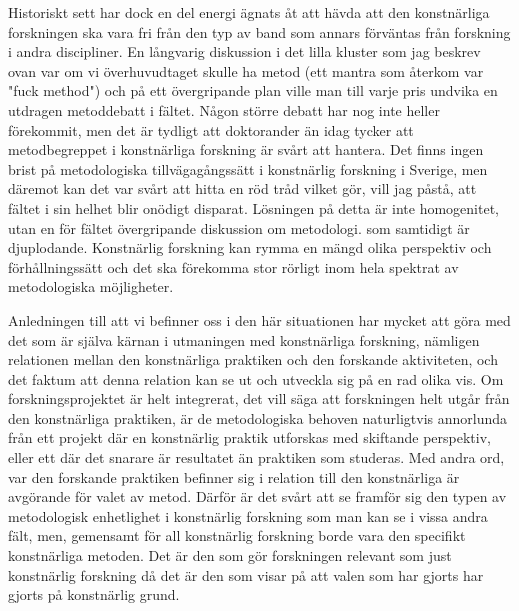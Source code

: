 \documentclass[11pt]{article}
\begin{document}
Historiskt sett har dock en del energi ägnats åt att hävda att den
konstnärliga forskningen ska vara fri från den typ av band som annars
förväntas från forskning i andra discipliner. En långvarig diskussion
i det lilla kluster som jag beskrev ovan var om vi överhuvudtaget
skulle ha metod (ett mantra som återkom var "fuck method") och på ett
övergripande plan ville man till varje pris undvika en utdragen
metoddebatt i fältet. Någon större debatt har nog inte heller
förekommit, men det är tydligt att doktorander än idag tycker att
metodbegreppet i konstnärliga forskning är svårt att hantera. Det
finns ingen brist på metodologiska tillvägagångssätt i konstnärlig
forskning i Sverige, men däremot kan det var svårt att hitta en röd
tråd vilket gör, vill jag påstå, att fältet i sin helhet blir onödigt
disparat. Lösningen på detta är inte homogenitet, utan en för fältet
övergripande diskussion om metodologi. som samtidigt är
djuplodande. Konstnärlig forskning kan rymma en mängd olika perspektiv
och förhållningssätt och det ska förekomma stor rörligt inom hela spektrat av metodologiska möjligheter.

Anledningen till att vi befinner oss i den här situationen har mycket
att göra med det som är själva kärnan i utmaningen med konstnärliga
forskning, nämligen relationen mellan den konstnärliga praktiken och
den forskande aktiviteten, och det faktum att denna relation kan se ut
och utveckla sig på en rad olika vis. Om forskningsprojektet är helt
integrerat, det vill säga att forskningen helt utgår från den
konstnärliga praktiken, är de metodologiska behoven naturligtvis
annorlunda från ett projekt där en konstnärlig praktik utforskas med
skiftande perspektiv, eller ett där det snarare är resultatet än
praktiken som studeras. Med andra ord, var den forskande praktiken
befinner sig i relation till den konstnärliga är avgörande för valet
av metod. Därför är det svårt att se framför sig den typen av
metodologisk enhetlighet i konstnärlig forskning som man kan se i
vissa andra fält, men, gemensamt för all konstnärlig forskning borde
vara den specifikt konstnärliga metoden. Det är den som gör forskningen relevant
som just konstnärlig forskning då det är den som visar på att valen
som har gjorts har gjorts på konstnärlig grund.
\end{document}

